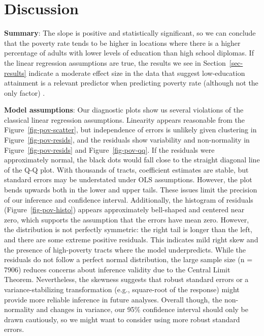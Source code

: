 \documentclass[
  letterpaper,
  DIV=11,
  numbers=noendperiod]{scrartcl}
\begin{document}
\section{Discussion}\label{sec-discussion}

\textbf{Summary}: The slope is positive and statistically significant,
so we can conclude that the poverty rate tends to be higher in locations
where there is a higher percentage of adults with lower levels of
education than high school diplomas. If the linear regression
assumptions are true, the results we see in Section~\ref{sec-results}
indicate a moderate effect size in the data that suggest low-education
attainment is a relevant predictor when predicting poverty rate
(although not the only factor) .

\textbf{Model assumptions}: Our diagnostic plots show us several
violations of the classical linear regression assumptions. Linearity
appears reasonable from the Figure~\ref{fig-pov-scatter}, but
independence of errors is unlikely given clustering in
Figure~\ref{fig-pov-resids}, and the residuals show variability and
non-normality in Figure~\ref{fig-pov-resids} and
Figure~\ref{fig-pov-qq}. If the residuals were approximately normal, the
black dots would fall close to the straight diagonal line of the Q-Q
plot. With thousands of tracts, coefficient estimates are stable, but
standard errors may be understated under OLS assumptions. However, the
plot bends upwards both in the lower and upper tails. These issues limit
the precision of our inference and confidence interval. Additionally,
the histogram of residuals (Figure~\ref{fig-pov-histo}) appears
approximately bell-shaped and centered near zero, which supports the
assumption that the errors have mean zero. However, the distribution is
not perfectly symmetric: the right tail is longer than the left, and
there are some extreme positive residuals. This indicates mild right
skew and the presence of high-poverty tracts where the model
underpredicts. While the residuals do not follow a perfect normal
distribution, the large sample size (n = 7906) reduces concerns about
inference validity due to the Central Limit Theorem. Nevertheless, the
skewness suggests that robust standard errors or a variance-stabilizing
transformation (e.g., square-root of the response) might provide more
reliable inference in future analyses. Overall though, the non-normality
and changes in variance, our 95\% confidence interval should only be
drawn cautiously, so we might want to consider using more robust
standard errors.
\end{document}
